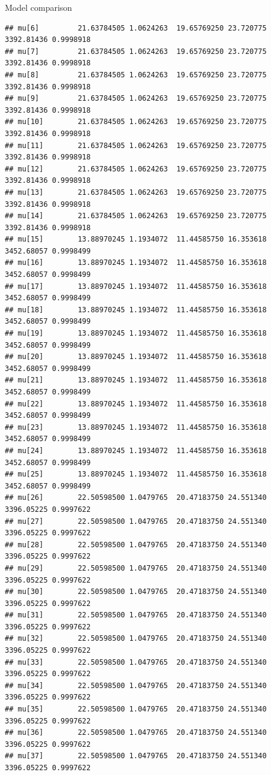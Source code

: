 \documentclass[
  ignorenonframetext,
]{beamer}
\begin{document}
\begin{frame}[fragile]{Model comparison}
\begin{verbatim}
## mu[6]         21.63784505 1.0624263  19.65769250 23.720775 3392.81436 0.9998918
## mu[7]         21.63784505 1.0624263  19.65769250 23.720775 3392.81436 0.9998918
## mu[8]         21.63784505 1.0624263  19.65769250 23.720775 3392.81436 0.9998918
## mu[9]         21.63784505 1.0624263  19.65769250 23.720775 3392.81436 0.9998918
## mu[10]        21.63784505 1.0624263  19.65769250 23.720775 3392.81436 0.9998918
## mu[11]        21.63784505 1.0624263  19.65769250 23.720775 3392.81436 0.9998918
## mu[12]        21.63784505 1.0624263  19.65769250 23.720775 3392.81436 0.9998918
## mu[13]        21.63784505 1.0624263  19.65769250 23.720775 3392.81436 0.9998918
## mu[14]        21.63784505 1.0624263  19.65769250 23.720775 3392.81436 0.9998918
## mu[15]        13.88970245 1.1934072  11.44585750 16.353618 3452.68057 0.9998499
## mu[16]        13.88970245 1.1934072  11.44585750 16.353618 3452.68057 0.9998499
## mu[17]        13.88970245 1.1934072  11.44585750 16.353618 3452.68057 0.9998499
## mu[18]        13.88970245 1.1934072  11.44585750 16.353618 3452.68057 0.9998499
## mu[19]        13.88970245 1.1934072  11.44585750 16.353618 3452.68057 0.9998499
## mu[20]        13.88970245 1.1934072  11.44585750 16.353618 3452.68057 0.9998499
## mu[21]        13.88970245 1.1934072  11.44585750 16.353618 3452.68057 0.9998499
## mu[22]        13.88970245 1.1934072  11.44585750 16.353618 3452.68057 0.9998499
## mu[23]        13.88970245 1.1934072  11.44585750 16.353618 3452.68057 0.9998499
## mu[24]        13.88970245 1.1934072  11.44585750 16.353618 3452.68057 0.9998499
## mu[25]        13.88970245 1.1934072  11.44585750 16.353618 3452.68057 0.9998499
## mu[26]        22.50598500 1.0479765  20.47183750 24.551340 3396.05225 0.9997622
## mu[27]        22.50598500 1.0479765  20.47183750 24.551340 3396.05225 0.9997622
## mu[28]        22.50598500 1.0479765  20.47183750 24.551340 3396.05225 0.9997622
## mu[29]        22.50598500 1.0479765  20.47183750 24.551340 3396.05225 0.9997622
## mu[30]        22.50598500 1.0479765  20.47183750 24.551340 3396.05225 0.9997622
## mu[31]        22.50598500 1.0479765  20.47183750 24.551340 3396.05225 0.9997622
## mu[32]        22.50598500 1.0479765  20.47183750 24.551340 3396.05225 0.9997622
## mu[33]        22.50598500 1.0479765  20.47183750 24.551340 3396.05225 0.9997622
## mu[34]        22.50598500 1.0479765  20.47183750 24.551340 3396.05225 0.9997622
## mu[35]        22.50598500 1.0479765  20.47183750 24.551340 3396.05225 0.9997622
## mu[36]        22.50598500 1.0479765  20.47183750 24.551340 3396.05225 0.9997622
## mu[37]        22.50598500 1.0479765  20.47183750 24.551340 3396.05225 0.9997622

\end{verbatim}
\end{frame}
\end{document}
